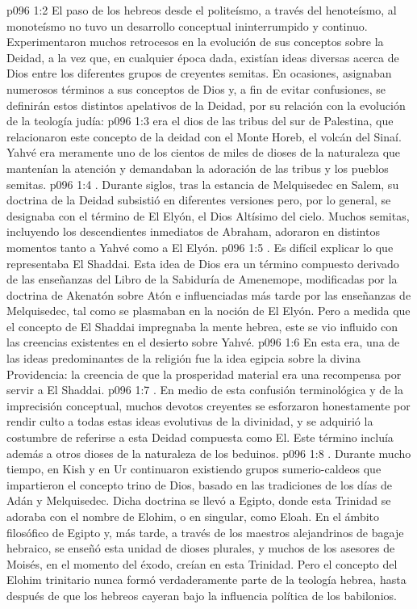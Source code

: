 \vs p096 1:2 El paso de los hebreos desde el politeísmo, a través del henoteísmo, al monoteísmo no tuvo un desarrollo conceptual ininterrumpido y continuo. Experimentaron muchos retrocesos en la evolución de sus conceptos sobre la Deidad, a la vez que, en cualquier época dada, existían ideas diversas acerca de Dios entre los diferentes grupos de creyentes semitas. En ocasiones, asignaban numerosos términos a sus conceptos de Dios y, a fin de evitar confusiones, se definirán estos distintos apelativos de la Deidad, por su relación con la evolución de la teología judía:
\vs p096 1:3  era el dios de las tribus del sur de Palestina, que relacionaron este concepto de la deidad con el Monte Horeb, el volcán del Sinaí. Yahvé era meramente uno de los cientos de miles de dioses de la naturaleza que mantenían la atención y demandaban la adoración de las tribus y los pueblos semitas.
\vs p096 1:4 . Durante siglos, tras la estancia de Melquisedec en Salem, su doctrina de la Deidad subsistió en diferentes versiones pero, por lo general, se designaba con el término de El Elyón, el Dios Altísimo del cielo. Muchos semitas, incluyendo los descendientes inmediatos de Abraham, adoraron en distintos momentos tanto a Yahvé como a El Elyón.
\vs p096 1:5 . Es difícil explicar lo que representaba El Shaddai. Esta idea de Dios era un término compuesto derivado de las enseñanzas del Libro de la Sabiduría de Amenemope, modificadas por la doctrina de Akenatón sobre Atón e influenciadas más tarde por las enseñanzas de Melquisedec, tal como se plasmaban en la noción de El Elyón. Pero a medida que el concepto de El Shaddai impregnaba la mente hebrea, este se vio influido con las creencias existentes en el desierto sobre Yahvé.
\vs p096 1:6 En esta era, una de las ideas predominantes de la religión fue la idea egipcia sobre la divina Providencia: la creencia de que la prosperidad material era una recompensa por servir a El Shaddai.
\vs p096 1:7 . En medio de esta confusión terminológica y de la imprecisión conceptual, muchos devotos creyentes se esforzaron honestamente por rendir culto a todas estas ideas evolutivas de la divinidad, y se adquirió la costumbre de referirse a esta Deidad compuesta como El. Este término incluía además a otros dioses de la naturaleza de los beduinos.
\vs p096 1:8 . Durante mucho tiempo, en Kish y en Ur continuaron existiendo grupos sumerio\hyp{}caldeos que impartieron el concepto trino de Dios, basado en las tradiciones de los días de Adán y Melquisedec. Dicha doctrina se llevó a Egipto, donde esta Trinidad se adoraba con el nombre de Elohim, o en singular, como Eloah. En el ámbito filosófico de Egipto y, más tarde, a través de los maestros alejandrinos de bagaje hebraico, se enseñó esta unidad de dioses plurales, y muchos de los asesores de Moisés, en el momento del éxodo, creían en esta Trinidad. Pero el concepto del Elohim trinitario nunca formó verdaderamente parte de la teología hebrea, hasta después de que los hebreos cayeran bajo la influencia política de los babilonios.
